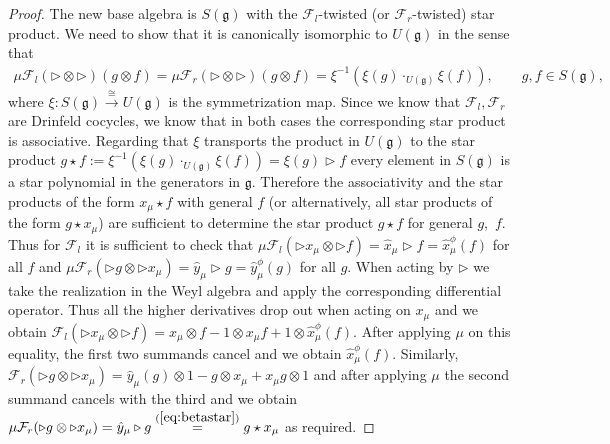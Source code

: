 \documentclass[10pt,a4paper]{amsart}
\def\gg{\mathfrak{g}}
\numberwithin{equation}{section}
\begin{document}
\begin{proof}
The new base algebra is $S(\gg)$ with the $\mathcal{F}_l$-twisted (or $\mathcal{F}_r$-twisted) star product. We need to show that it is canonically isomorphic to $U(\gg)$ in the sense that
\begin{gather*}
\mu \mathcal{F}_l(\triangleright\otimes\triangleright)(g\otimes f) =\mu \mathcal{F}_r(\triangleright\otimes\triangleright)(g\otimes f)
= \xi^{-1}(\xi(g)\cdot_{U(\gg)}\xi(f)),\qquad g,f\in S(\gg),
\end{gather*}
where $\xi\colon S(\gg)\stackrel\cong\to U(\gg)$ is the symmetrization map. Since we know that $\mathcal{F}_l,\mathcal{F}_r$ are Drinfeld cocycles, we know that in both cases the corresponding star product is associative. Regarding that $\xi$ transports the product in $U(\gg)$ to the star product $g\star f := \xi^{-1}(\xi(g)\cdot_{U(\gg)}\xi(f)) = \xi(g)\triangleright f$ every element in $S(\gg)$ is a star polynomial in the generators in $\gg$. Therefore the associativity and the star products of the form $x_\mu\star f$ with general $f$ (or
alternatively, all star products of the form $g\star x_\mu$) are sufficient to determine the star product $g\star f$ for general $g$,~$f$. Thus for $\mathcal{F}_l$ it is sufficient to check that $\mu \mathcal{F}_l(\triangleright x_\mu\otimes \triangleright f) = \hat{x}_\mu\triangleright f = \hat{x}_\mu^\phi(f)$ for all $f$ and $\mu \mathcal{F}_r(\triangleright g\otimes \triangleright x_\mu) = \hat{y}_\mu\triangleright g = \hat{y}^\phi_\mu(g)$ for all $g$. When acting by $\triangleright$ we take the realization in the Weyl algebra and apply the corresponding differential operator. Thus all the higher derivatives drop out when acting on $x_\mu$ and we obtain $\mathcal{F}_l(\triangleright x_\mu\otimes \triangleright f) = x_\mu\otimes f - 1\otimes x_\mu f + 1\otimes\hat{x}^\phi_\mu(f)$. After applying $\mu$ on this equality, the first two summands cancel and we obtain $\hat{x}^\phi_\mu(f)$. Similarly, $\mathcal{F}_r(\triangleright g\otimes \triangleright x_\mu)= \hat{y}_\mu(g)\otimes 1 - g\otimes x_\mu + x_\mu g\otimes 1$ and after applying $\mu$ the second summand cancels with the third and we obtain $\mu\mathcal{F}_r(\triangleright g\otimes \triangleright x_\mu) =\hat{y}_\mu\triangleright g \stackrel{(\ref{eq:betastar})}= g\star x_\mu$ as required.


\end{proof}
\end{document}
